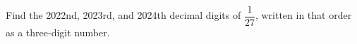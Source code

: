 Find the 2022nd, 2023rd, and 2024th decimal digits of $\dfrac{1}{27}$, written in that order as a three-digit number.
